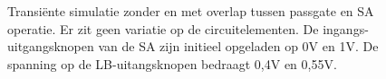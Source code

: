 \begin{figure}[!ht]
\centering
{}
\caption[Transiënte simulatie zonder en met overlap]{Transiënte simulatie zonder en met overlap tussen passgate en SA operatie. Er zit geen variatie op de circuitelementen. De ingangs-uitgangsknopen van de SA zijn initieel opgeladen op 0V en 1V. De spanning op de LB-uitangsknopen bedraagt 0,4V en 0,55V.}\label{fig:no-overlap-overlap}
\end{figure}

